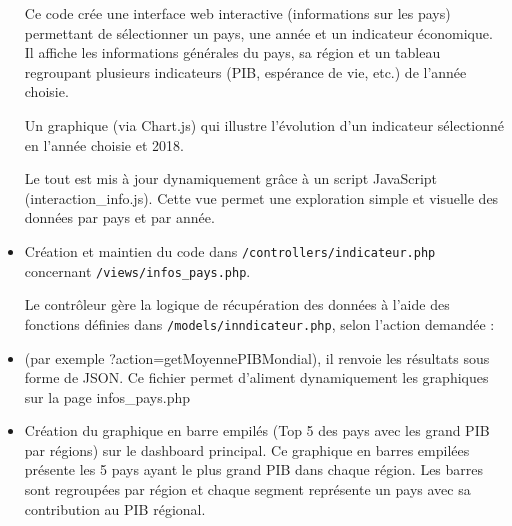 \documentclass[11pt]{article}
\begin{document}
\begin{itemize}
    Ce code crée une interface web interactive (informations sur les pays) permettant de sélectionner un pays, une année et un indicateur économique.
    Il affiche les informations générales du pays, sa région et un tableau regroupant plusieurs indicateurs (PIB, espérance de vie, etc.) de l'année choisie.
    \vspace{0.2cm}
    
    Un graphique (via Chart.js) qui illustre l’évolution d’un indicateur sélectionné en l'année choisie et 2018.
    \vspace{0.2cm}
    
    Le tout est mis à jour dynamiquement grâce à un script JavaScript (interaction\_info.js).
    Cette vue permet une exploration simple et visuelle des données par pays et par année.
    \vspace{0.2cm}
        
    \item Création et maintien du code dans \texttt{/controllers/indicateur.php} concernant \newline \texttt{/views/infos\_pays.php}. 
    
        \vspace{0.2cm}
        
        Le contrôleur gère la logique de récupération des données à l’aide des fonctions définies dans \texttt{/models/inndicateur.php}, selon l’action demandée : \vspace{0.2cm} 
        \item (par exemple ?action=getMoyennePIBMondial), il renvoie les résultats sous forme de JSON.
    Ce fichier permet d'aliment dynamiquement les graphiques sur la page infos\_pays.php
    
    \vspace{0.2cm}
    
    \item Création du graphique en barre empilés (Top 5 des pays avec les grand PIB par régions) sur le dashboard principal. Ce graphique en barres empilées présente les 5 pays ayant le plus grand PIB dans chaque région. Les barres sont regroupées par région et chaque segment représente un pays avec sa contribution au PIB régional. 

\end{itemize}
\end{document}
